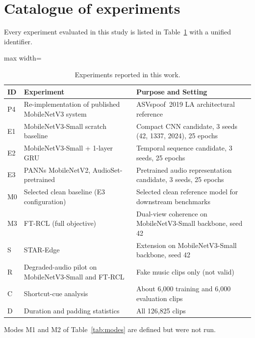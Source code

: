 \section{Catalogue of experiments}
\label{sec:cat}

Every experiment evaluated in this study is listed in Table~\ref{tab:catalogue} with a unified identifier.

\begin{table}[htbp]
\centering
\caption{Experiments reported in this work.}
\label{tab:catalogue}
\small
\begin{adjustbox}{max width=\textwidth}
\begin{tabular}{@{}p{1.1cm}p{6.3cm}p{6.6cm}@{}}
\toprule
ID & Experiment & Purpose and Setting \\
\midrule
P4 & Re-implementation of published MobileNetV3 system~\cite{pham2024deepfake} & ASVspoof~2019 LA architectural reference \\
\midrule
E1 & MobileNetV3-Small scratch baseline & Compact CNN candidate, 3 seeds (42, 1337, 2024), 25 epochs \\
E2 & MobileNetV3-Small + 1-layer GRU & Temporal sequence candidate, 3 seeds, 25 epochs \\
E3 & PANNs MobileNetV2, AudioSet-pretrained & Pretrained audio representation candidate, 3 seeds, 25 epochs \\
M0 & Selected clean baseline (E3 configuration) & Selected clean reference model for downstream benchmarks \\
\midrule
M3 & FT-RCL (full objective) & Dual-view coherence on MobileNetV3-Small backbone, seed 42 \\
S & STAR-Edge & Extension on MobileNetV3-Small backbone, seed 42 \\
R & Degraded-audio pilot on MobileNetV3-Small and FT-RCL & Fake music clips only (not valid) \\
C & Shortcut-cue analysis & About 6{,}000 training and 6{,}000 evaluation clips \\
D & Duration and padding statistics & All 126{,}825 clips \\
\bottomrule
\end{tabular}
\end{adjustbox}
\end{table}

Modes M1 and M2 of Table~\ref{tab:modes} are defined but were not run.

